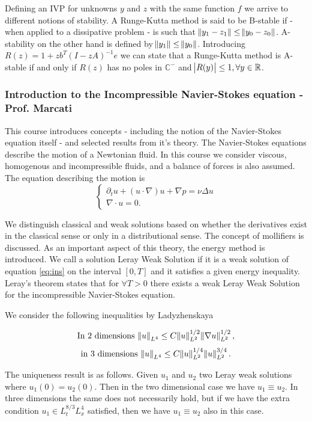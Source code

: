 \documentclass{article}
\begin{document}
Defining an IVP for unknowns $y$ and $z$ with the same function $f$ we arrive to different notions of stability. A Runge-Kutta method is said to be B-stable if - when applied to a dissipative problem - is such that $\norm{y_1 - z_1} \leq \norm{y_0 - z_0}$. A-stability on the other hand is defined by $\norm{y_1} \leq \norm{y_0}$. Introducing $R(z) = 1 + z b^T (I - zA)^{-1}e$ we can state that a Runge-Kutta method is A-stable if and only if $R(z)$ has no poles in $\mathbb{C}^{-}$ and $\abs{R(y)} \leq 1, \forall y \in \mathbb{R}$.

\subsubsection{Introduction to the Incompressible Navier-Stokes equation - Prof. Marcati}
This course introduces concepts - including the notion of the Navier-Stokes equation itself - and selected results from it's theory. The Navier-Stokes equations describe the motion of a Newtonian fluid. In this course we consider viscous, homogenous and incompressible fluids, and a balance of forces is also assumed. The equation describing the motion is
\begin{equation} \label{eq:ins}
   \begin{cases}
               \partial_t u + (u \cdot \nabla)u + \nabla p = \nu \Delta u\\
               \nabla \cdot u = 0.
   \end{cases}
\end{equation}

We distinguish classical and weak solutions based on whether the derivatives exist in the classical sense or only in a distributional sense. The concept of mollifiers is discussed. As an important aspect of this theory, the energy method is introduced.
We call a solution Leray Weak Solution if it is a weak solution of equation \ref{eq:ins} on the interval $[0,T]$ and it satisfies a given energy inequality. Leray's theorem states that for $\forall T > 0$ there exists a weak Leray Weak Solution for the incompressible Navier-Stokes equation.

We consider the following inequalities by Ladyzhenskaya

\[ \text{In } 2 \text{ dimensions } \norm{u}_{L^4} \leq C \norm{u}_{L^2}^{1/2} \norm{\nabla u}_{L^2}^{1/2}, \]
\[ \text{in } 3 \text{ dimensions } \norm{u}_{L^4} \leq C \norm{u}_{L^2}^{1/4} \norm{u}_{L^2}^{3/4}. \]

The uniqueness result is as follows. Given $u_1$ and $u_2$ two Leray weak solutions where $u_1(0) = u_2(0)$. Then in the two dimensional case we have $u_1 \equiv u_2$. In three dimensions the same does not necessarily hold, but if we have the extra condition $u_1 \in L_t^{8/3}L_x^4$ satisfied, then we have $u_1 \equiv u_2$ also in this case.
\end{document}
